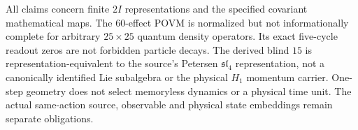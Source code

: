 \documentclass[11pt]{article}
\begin{document}
\begin{remark}
\label{p1b:rem:single-shell-observable-boundary}
All claims concern finite $2I$ representations and the specified
covariant mathematical maps. The $60$-effect POVM is normalized but
not informationally complete for arbitrary $25\times25$ quantum
density operators. Its exact five-cycle readout zeros are not forbidden
particle decays. The derived blind $15$ is representation-equivalent
to the source's Petersen $\mathfrak{sl}_4$ representation, not a
canonically identified Lie subalgebra or the physical $H_1$ momentum
carrier. One-step geometry does not select memoryless dynamics or a
physical time unit. The actual same-action source, observable and
physical state embeddings remain separate obligations.
\end{remark}
\end{document}

